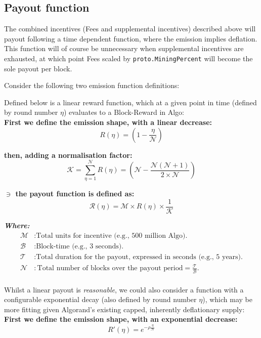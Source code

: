 \documentclass[11pt,a4paper]{article}
\begin{document}
\pagebreak

\subsection{Payout function}
The combined incentives (Fees and supplemental incentives) described above will payout following a time dependent 
function, where the emission implies deflation. This function will of course be unnecessary when supplemental incentives
are exhausted, at which point Fees scaled by \texttt{proto.MiningPercent} will become the sole payout per block.

Consider the following two emission function definitions:

Defined below is a linear reward function, which at a given point in time (defined by round number $\eta$) evaluates to 
a \gls{Block-Reward} in Algo:\\

\textbf{First we define the emission shape, with a linear decrease:}
\[
R(\eta) = (1- \frac{\eta}{\mathcal{N}})
\]

\textbf{then, adding a normalisation factor:}
\[
\mathcal{K} = \sum_{\eta=1}^\mathcal{N}R(\eta)=(\mathcal{N} -  \frac{\mathcal{N}(\mathcal{N}+1)}{2\times \mathcal{N}})  
\]

\textbf{$\ni$ the payout function is defined as:}
\[
\mathcal{R}(\eta) = \mathcal{M} \times R(\eta) \times \frac{1}{\mathcal{K}}
\]

\textbf{\emph{Where:}}
\begin{align*}
    \mathcal{M} & : \text{Total units for incentive (e.g., 500 million Algo).} \\
    \mathcal{B} & : \text{Block-time (e.g., 3 seconds).} \\
    \mathcal{T} & : \text{Total duration for the payout, expressed in seconds (e.g., 5 years).} \\
    \mathcal{N} & : \text{Total number of blocks over the payout period} = \frac{\mathcal{T}}{\mathcal{B}}.\\
\end{align*}

Whilst a linear payout is \textit{reasonable}, we could also consider a function with a configurable exponential decay 
(also defined by round number $\eta$), which may be more fitting given Algorand's existing capped, inherently 
deflationary supply: \\ 

\textbf{First we define the emission shape, with an exponential decrease:}
\[
R'(\eta)= e^{-\rho\frac{\eta}{\mathcal{N}}}
\]
\end{document}
